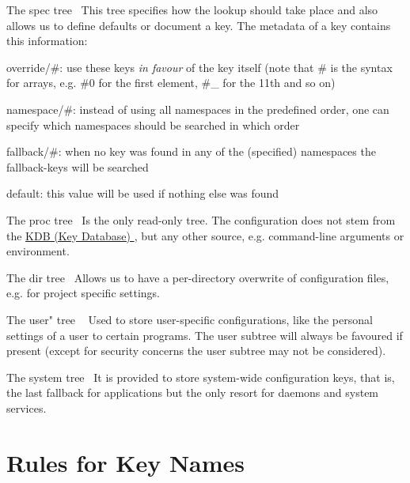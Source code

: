 \begin{DoxyItemize}
\item The {\ttfamily spec} tree~\newline
 This tree specifies how the lookup should take place and also allows us to define defaults or document a key. The metadata of a key contains this information\+:
\begin{DoxyItemize}
\item {\ttfamily override/\#}\+: use these keys {\itshape in favour} of the key itself (note that {\ttfamily \#} is the syntax for arrays, e.\+g. {\ttfamily \#0} for the first element, {\ttfamily \#\+\_} for the 11th and so on)
\item {\ttfamily namespace/\#}\+: instead of using all namespaces in the predefined order, one can specify which namespaces should be searched in which order
\item {\ttfamily fallback/\#}\+: when no key was found in any of the (specified) namespaces the {\ttfamily fallback}-\/keys will be searched
\item {\ttfamily default}\+: this value will be used if nothing else was found
\end{DoxyItemize}
\item The {\ttfamily proc} tree~\newline
 Is the only read-\/only tree. The configuration does not stem from the \hyperlink{group__kdb}{K\+D\+B (Key Database) }, but any other source, e.\+g. command-\/line arguments or environment.
\item The {\ttfamily dir} tree~\newline
 Allows us to have a per-\/directory overwrite of configuration files, e.\+g. for project specific settings.
\item The {\ttfamily user"} tree ~\newline
 Used to store user-\/specific configurations, like the personal settings of a user to certain programs. The user subtree will always be favoured if present (except for security concerns the user subtree may not be considered).
\item The {\ttfamily system} tree~\newline
 It is provided to store system-\/wide configuration keys, that is, the last fallback for applications but the only resort for daemons and system services.
\end{DoxyItemize}\hypertarget{index_rules}{}\section{Rules for Key Names}\label{index_rules}
